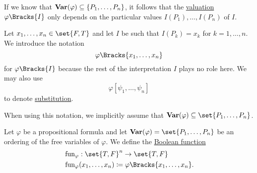 \begin{remark}\label{rem:propositional_formula_valuation_without_variable_assignment}
  If we know that \( \operatorname{\mathbf{Var}}(\varphi) \subseteq \{ P_1, \ldots, P_n \} \), it follows that the \hyperref[def:first_order_valuation/formula_valuation]{valuation} \( \varphi\Bracks{I} \) only depends on the particular values \( I(P_1), \ldots, I(P_n) \) of \( I \).

  Let \( x_1, \ldots, x_n \in \set{ F, T } \) and let \( I \) be such that \( I(P_k) = x_k \) for \( k = 1, \ldots, n \). We introduce the notation
  \begin{equation}\label{eq:rem:propositional_formula_valuation_without_variable_assignment/short_semantic}
    \varphi\Bracks{x_1, \ldots, x_n}
  \end{equation}
  for \( \varphi\Bracks{I} \) because the rest of the interpretation \( I \) plays no role here. We may also use
  \begin{equation}\label{eq:rem:propositional_formula_valuation_without_variable_assignment/short_syntactic}
    \varphi[\psi_1, \ldots, \psi_n]
  \end{equation}
  to denote \hyperref[def:propositional_substitution]{substitution}.

  When using this notation, we implicitly assume that \( \boldop{Var}(\varphi) \subseteq \set{ P_1, \ldots, P_n } \).
\end{remark}

\begin{definition}\label{def:propositional_formula_induced_function}
  Let \( \varphi \) be a propositional formula and let \( \boldop{Var}(\varphi) = \set{ P_1, \ldots, P_n } \) be an ordering of the free variables of \( \varphi \). We define the \hyperref[def:boolean_function]{Boolean function}
  \begin{equation}\label{eq:def:propositional_formula_induced_function}
    \begin{split}
      &\fun_\varphi: \set{ T, F }^n \to \set{ T, F } \\
      &\fun_\varphi(x_1, \ldots, x_n) \coloneqq \varphi\Bracks{x_1, \ldots, x_n}.
    \end{split}
  \end{equation}
\end{definition}

